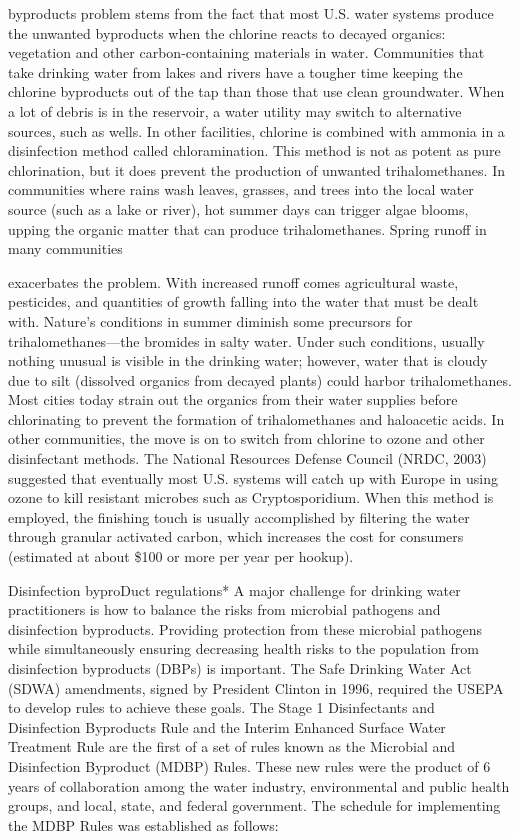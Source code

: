 \documentclass{article}
\begin{document}
byproducts problem stems from the fact that most U.S. water systems
produce the unwanted byproducts when the chlorine reacts to decayed
organics: vegetation and other carbon-containing materials in water.
Communities that take drinking water from lakes and rivers have a
tougher time keeping the chlorine byproducts out of the tap than those
that use clean groundwater. When a lot of debris is in the reservoir, a
water utility may switch to alternative sources, such as wells. In other
facilities, chlorine is combined with ammonia in a disinfection method
called chloramination. This method is not as potent as pure
chlorination, but it does prevent the production of unwanted
trihalomethanes. In communities where rains wash leaves, grasses, and
trees into the local water source (such as a lake or river), hot summer
days can trigger algae blooms, upping the organic matter that can
produce trihalomethanes. Spring runoff in many communities

exacerbates the problem. With increased runoff comes agricultural waste,
pesticides, and quantities of growth falling into the water that must be
dealt with. Nature's conditions in summer diminish some precursors for
trihalomethanes---the bromides in salty water. Under such conditions,
usually nothing unusual is visible in the drinking water; however, water
that is cloudy due to silt (dissolved organics from decayed plants)
could harbor trihalomethanes. Most cities today strain out the organics
from their water supplies before chlorinating to prevent the formation
of trihalomethanes and haloacetic acids. In other communities, the move
is on to switch from chlorine to ozone and other disinfectant methods.
The National Resources Defense Council (NRDC, 2003) suggested that
eventually most U.S. systems will catch up with Europe in using ozone to
kill resistant microbes such as Cryptosporidium. When this method is
employed, the finishing touch is usually accomplished by filtering the
water through granular activated carbon, which increases the cost for
consumers (estimated at about \$100 or more per year per hookup).

Disinfection byproDuct regulations* A major challenge for drinking water
practitioners is how to balance the risks from microbial pathogens and
disinfection byproducts. Providing protection from these microbial
pathogens while simultaneously ensuring decreasing health risks to the
population from disinfection byproducts (DBPs) is important. The Safe
Drinking Water Act (SDWA) amendments, signed by President Clinton in
1996, required the USEPA to develop rules to achieve these goals. The
Stage 1 Disinfectants and Disinfection Byproducts Rule and the Interim
Enhanced Surface Water Treatment Rule are the first of a set of rules
known as the Microbial and Disinfection Byproduct (MDBP) Rules. These
new rules were the product of 6 years of collaboration among the water
industry, environmental and public health groups, and local, state, and
federal government. The schedule for implementing the MDBP Rules was
established as follows:
\end{document}
